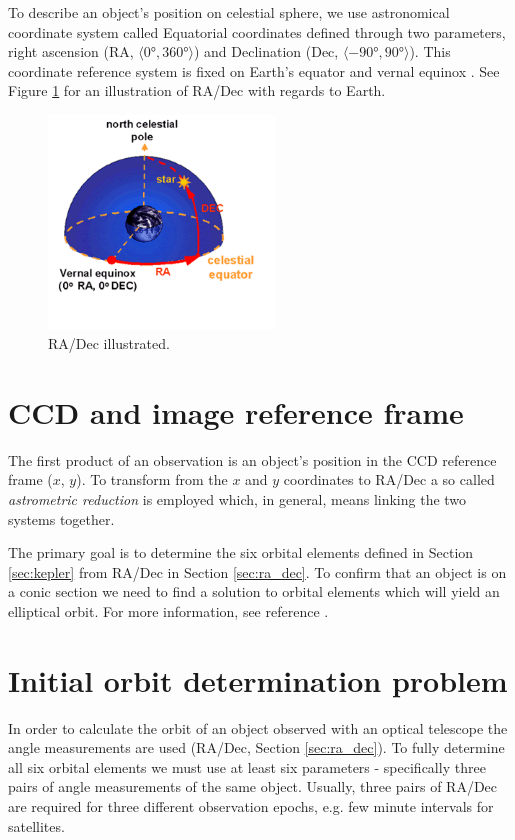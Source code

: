 	To describe an object's position on celestial sphere, we use astronomical coordinate system called Equatorial coordinates defined through two parameters, right ascension (RA, $\langle\ang{0},\ang{360}\rangle$) and Declination (Dec, $\langle\ang{-90},\ang{90}\rangle$). This coordinate reference system is fixed on Earth's equator and vernal equinox \citep{montenbruck2005satellite}. See Figure \ref{fig:equatorial} for an illustration of RA/Dec with regards to Earth.
	
	\begin{figure}[H]
	\centering
	  \includegraphics[width=6cm]{images/equatorial}
		  \caption{RA/Dec illustrated.}
	  \label{fig:equatorial}
	\end{figure}

\section{CCD and image reference frame}\label{sec:ccd}

	The first product of an observation is an object's position in the CCD reference frame ($x$, $y$). To transform from the $x$ and $y$ coordinates to RA/Dec a so called \emph{astrometric reduction} is employed which, in general, means linking the two systems together.
	
	The primary goal is to determine the six orbital elements defined in Section \ref{sec:kepler} from RA/Dec in Section \ref{sec:ra_dec}. To confirm that an object is on a conic section we need to find a solution to orbital elements which will yield an elliptical orbit. For more information, see reference \citep{montenbruck2005satellite}.
	
\section{Initial orbit determination problem}\label{sec:init_orbit_det}
	
	In order to calculate the orbit of an object observed with an optical telescope the angle measurements are used (RA/Dec, Section \ref{sec:ra_dec}). To fully determine all six orbital elements we must use at least six parameters - specifically three pairs of angle measurements of the same object. Usually, three pairs of RA/Dec are required for three different observation epochs, e.g. few minute intervals for satellites. 	
	
